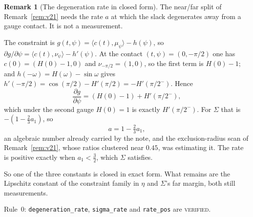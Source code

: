 \documentclass[11pt]{article}
\theoremstyle{definition}
\newtheorem{remark}[theorem]{Remark}
\newcommand{\Sig}{\Sigma}
\begin{document}
\begin{remark}[The degeneration rate in closed form]\label{rem:v22}
The near/far split of Remark~\ref{rem:v21} needs the rate $a$ at which the slack degenerates
away from a gauge contact. It is not a measurement.

The constraint is $g(t,\psi)=\langle c(t),\mu_\psi\rangle-h(\psi)$, so
$\partial g/\partial\psi=\langle c(t),\nu_\psi\rangle-h'(\psi)$. At the contact
$(t,\psi)=(0,-\pi/2)$ one has $c(0)=(H(0)-1,0)$ and $\nu_{-\pi/2}=(1,0)$, so the first term is
$H(0)-1$; and $h(-\omega)=H(\omega)-\sin\omega$ gives
$h'(-\pi/2)=\cos(\pi/2)-H'(\pi/2)=-H'(\pi/2^-)$. Hence
\[
  \frac{\partial g}{\partial\psi}=(H(0)-1)+H'(\pi/2^-) ,
\]
which under the second gauge $H(0)=1$ is exactly $H'(\pi/2^-)$. For $\Sig$ that is
$-(1-\tfrac23a_1)$, so
\[
  a=1-\tfrac23a_1 ,
\]
an algebraic number already carried by the note, and the exclusion-radius scan of
Remark~\ref{rem:v21}, whose ratios clustered near $0.45$, was estimating it. The rate is
positive exactly when $a_1<\tfrac32$, which $\Sig$ satisfies.

So one of the three constants is closed in exact form. What remains are the Lipschitz constant
of the constraint family in $\eta$ and $\Sig$'s far margin, both still measurements.

Rule~0: \verb|degeneration_rate|, \verb|sigma_rate| and \verb|rate_pos| are \textsc{verified}.
\end{remark}
\end{document}
